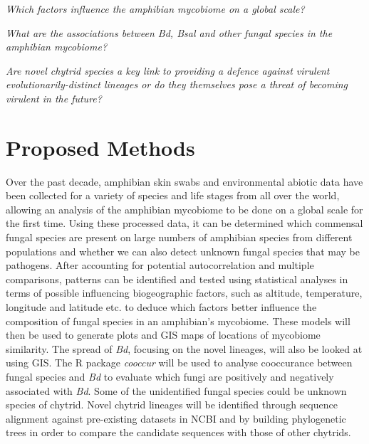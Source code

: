 \documentclass[11pt, a4paper, titlepage]{article}
\begin{document}
\begin{list}{}{\leftmargin=1em}
	\item \textit{Which factors influence the amphibian mycobiome on a global scale?}
	
	\item \textit{What are the associations between \textit{Bd}, \textit{Bsal} and other fungal species in the amphibian mycobiome?}
	
	\item \textit{Are novel chytrid species a key link to providing a defence against virulent evolutionarily-distinct lineages or do they themselves pose a threat of becoming virulent in the future?} 
\end{list}

\section{Proposed Methods}

\noindent Over the past decade, amphibian skin swabs and environmental abiotic data have been collected for a variety of species and life stages from all over the world, allowing an analysis of the amphibian mycobiome to be done on a global scale for the first time. Using these processed data, it can be determined which commensal fungal species are present on large numbers of amphibian species from different populations and whether we can also detect unknown fungal species that may be pathogens. After accounting for potential autocorrelation and multiple comparisons, patterns can be identified and tested using statistical analyses in terms of possible influencing biogeographic factors, such as altitude, temperature, longitude and latitude etc. to deduce which factors better influence the composition of fungal species in an amphibian's mycobiome. These models will then be used to generate plots and GIS maps of locations of mycobiome similarity. The spread of \textit{Bd}, focusing on the novel lineages, will also be looked at using GIS. The R package \textit{cooccur} \parencite{RCooccur} will be used to analyse cooccurance between fungal species and \textit{Bd} to evaluate which fungi are positively and negatively associated with \textit{Bd}. Some of the unidentified fungal species could be unknown species of chytrid. Novel chytrid lineages will be identified through sequence alignment against pre-existing datasets in NCBI and by building phylogenetic trees in order to compare the candidate sequences with those of other chytrids. 
\end{document}
